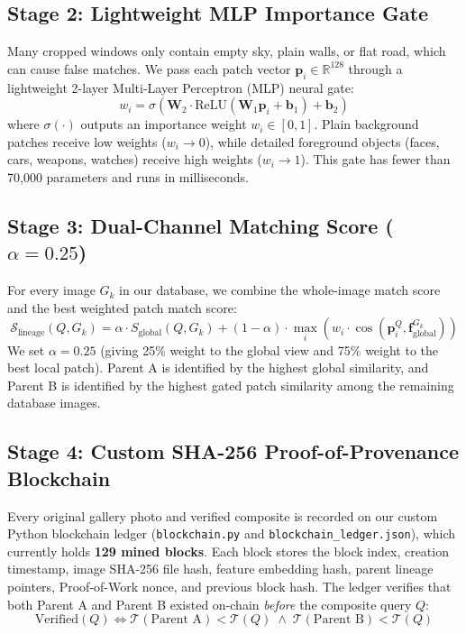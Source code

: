 \documentclass[12pt,a4paper]{article}
\begin{document}
\subsection{Stage 2: Lightweight MLP Importance Gate}
Many cropped windows only contain empty sky, plain walls, or flat road, which can cause false matches. We pass each patch vector $\mathbf{p}_i \in \mathbb{R}^{128}$ through a lightweight 2-layer Multi-Layer Perceptron (MLP) neural gate:
\begin{equation}
w_i = \sigma\left(\mathbf{W}_2 \cdot \text{ReLU}(\mathbf{W}_1 \mathbf{p}_i + \mathbf{b}_1) + \mathbf{b}_2\right)
\end{equation}
where $\sigma(\cdot)$ outputs an importance weight $w_i \in [0, 1]$. Plain background patches receive low weights ($w_i \to 0$), while detailed foreground objects (faces, cars, weapons, watches) receive high weights ($w_i \to 1$). This gate has fewer than 70,000 parameters and runs in milliseconds.

\subsection{Stage 3: Dual-Channel Matching Score ($\alpha = 0.25$)}
For every image $G_k$ in our database, we combine the whole-image match score and the best weighted patch match score:
\begin{equation}
\mathcal{S}_{\text{lineage}}(Q, G_k) = \alpha \cdot S_{\text{global}}(Q, G_k) + (1 - \alpha) \cdot \max_{i} \left( w_i \cdot \cos(\mathbf{p}_i^Q, \mathbf{f}_{\text{global}}^{G_k}) \right)
\end{equation}
We set $\alpha = 0.25$ (giving 25\% weight to the global view and 75\% weight to the best local patch). Parent A is identified by the highest global similarity, and Parent B is identified by the highest gated patch similarity among the remaining database images.

\subsection{Stage 4: Custom SHA-256 Proof-of-Provenance Blockchain}
Every original gallery photo and verified composite is recorded on our custom Python blockchain ledger (\texttt{blockchain.py} and \texttt{blockchain\_ledger.json}), which currently holds \textbf{129 mined blocks}. Each block stores the block index, creation timestamp, image SHA-256 file hash, feature embedding hash, parent lineage pointers, Proof-of-Work nonce, and previous block hash. The ledger verifies that both Parent A and Parent B existed on-chain \textit{before} the composite query $Q$:
\begin{equation}
\text{Verified}(Q) \iff \mathcal{T}(\text{Parent A}) < \mathcal{T}(Q) \;\land\; \mathcal{T}(\text{Parent B}) < \mathcal{T}(Q)
\end{equation}
\end{document}
